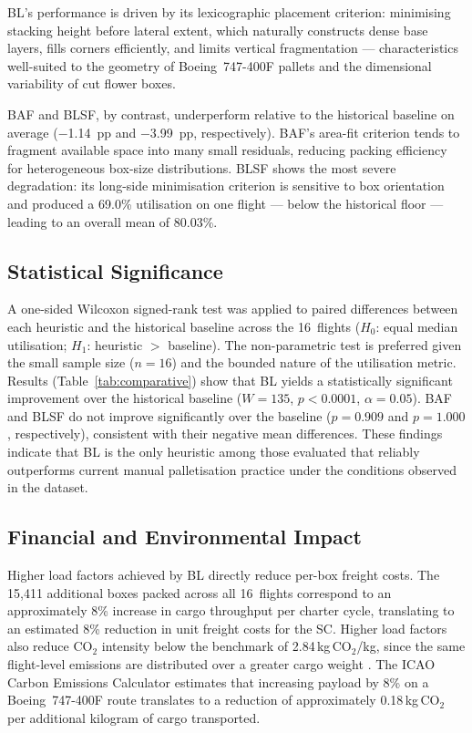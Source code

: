 \documentclass[12pt,a4paper]{article}
\begin{document}
BL's performance is driven by its lexicographic placement criterion:
minimising stacking height before lateral extent, which naturally
constructs dense base layers, fills corners efficiently, and limits
vertical fragmentation --- characteristics well-suited to the
geometry of Boeing~747-400F pallets and the dimensional variability
of cut flower boxes.

BAF and BLSF, by contrast, underperform relative to the historical
baseline on average ($-$1.14~pp and $-$3.99~pp, respectively).
BAF's area-fit criterion tends to fragment available space into many
small residuals, reducing packing efficiency for heterogeneous
box-size distributions.
BLSF shows the most severe degradation: its long-side minimisation
criterion is sensitive to box orientation and produced a 69.0\%
utilisation on one flight --- below the historical floor --- leading
to an overall mean of 80.03\%.

\subsection{Statistical Significance}

A one-sided Wilcoxon signed-rank test \citep{Wilcoxon1945} was
applied to paired differences between each heuristic and the
historical baseline across the 16~flights
($H_0$: equal median utilisation; $H_1$: heuristic $>$ baseline).
The non-parametric test is preferred given the small sample size
($n=16$) and the bounded nature of the utilisation metric.
Results (Table~\ref{tab:comparative}) show that BL yields a
statistically significant improvement over the historical baseline
($W = 135$, $p < 0.0001$, $\alpha = 0.05$).
BAF and BLSF do not improve significantly over the baseline
($p = 0.909$ and $p = 1.000$, respectively), consistent with their
negative mean differences.
These findings indicate that BL is the only heuristic among those
evaluated that reliably outperforms current manual palletisation
practice under the conditions observed in the dataset.

\subsection{Financial and Environmental Impact}

Higher load factors achieved by BL directly reduce per-box freight
costs.
The 15{,}411 additional boxes packed across all 16~flights correspond
to an approximately 8\% increase in cargo throughput per charter cycle,
translating to an estimated 8\% reduction in unit freight costs for
the SC.
Higher load factors also reduce CO$_2$ intensity below the benchmark
of 2.84\,kg\,CO$_2$/kg, since the same flight-level emissions are
distributed over a greater cargo weight
\citep{Baxter2020,Queiroz2024}.
The ICAO Carbon Emissions Calculator \citep{ICAO2025} estimates that
increasing payload by 8\% on a Boeing~747-400F route translates to a
reduction of approximately 0.18\,kg\,CO$_2$ per additional kilogram
of cargo transported.
\end{document}
